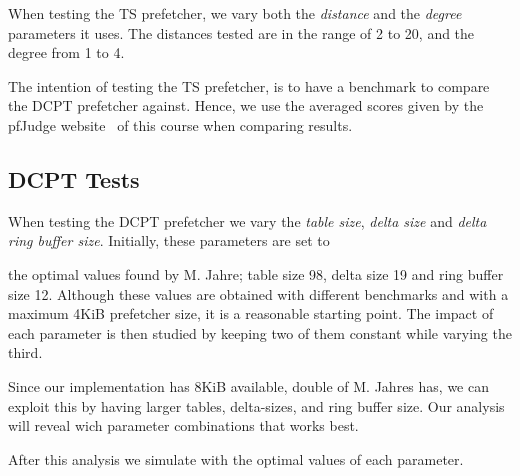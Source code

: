 When testing the TS prefetcher, we vary both the \emph{distance} and the
\emph{degree} parameters it uses. The distances tested are in the range of 2 to
20, and the degree from 1 to 4.

The intention of testing the TS prefetcher, is to have a benchmark to compare
the DCPT prefetcher against. Hence, we use the averaged scores given by the
pfJudge website~\cite[Sec.~2.5]{guidelines} of this course when comparing
results.

\subsection{DCPT Tests}

When testing the DCPT prefetcher we vary the \emph{table size}, \emph{delta
size} and \emph{delta ring buffer size}. Initially, these parameters are set to

the optimal values found by
M. Jahre\cite{dcpt}; table size 98, delta size 19 and ring buffer size 12.
Although these values are obtained with different benchmarks and with a maximum
4KiB prefetcher size, it is a reasonable starting point. The impact of each
parameter is then studied by keeping two of them constant while varying the
third.

Since our implementation has 8KiB available, double of M. Jahres \cite{dcpt}
has, we can exploit this by having larger tables, delta-sizes, and ring buffer
size. Our analysis will reveal wich parameter combinations that works best.

After this analysis we simulate with the optimal values of each parameter.

